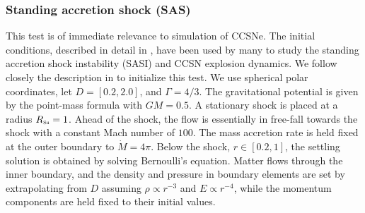 \documentclass[letterpaper]{jpconf}
\newcommand{\shock}{\textnormal{\tiny\textsc{Sh}}}
\begin{document}
\subsubsection{Standing accretion shock (SAS)}

This test is of immediate relevance to simulation of CCSNe.  
The initial conditions, described in detail in \cite{blondin_etal_2003}, have been used by many to study the standing accretion shock instability (SASI) and CCSN explosion dynamics.  
We follow closely the description in \cite{blondin_etal_2003} to initialize this test.  
We use spherical polar coordinates, let $D=[0.2,2.0]$, and $\Gamma=4/3$.  
The gravitational potential is given by the point-mass formula with $GM=0.5$.  
A stationary shock is placed at a radius $R_{\shock}=1$.  
Ahead of the shock, the flow is essentially in free-fall towards the shock with a constant Mach number of $100$.  
The mass accretion rate is held fixed at the outer boundary to $\dot{M}=4\pi$.  
Below the shock, $r\in[0.2,1]$, the settling solution is obtained by solving Bernoulli's equation.  
Matter flows through the inner boundary, and the density and pressure in boundary elements are set by extrapolating from $D$ assuming $\rho\propto r^{-3}$ and $E\propto r^{-4}$, while the momentum components are held fixed to their initial values.  
\end{document}
